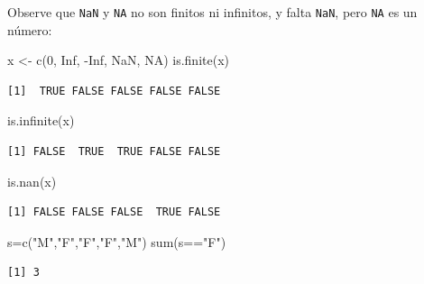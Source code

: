 \documentclass[
  ignorenonframetext,
  aspectratio=169,
  spanish,
]{beamer}
\newenvironment{Shaded}{\begin{snugshade}}{\end{snugshade}}
\newcommand{\ConstantTok}[1]{\textcolor[rgb]{0.56,0.35,0.01}{#1}}
\newcommand{\DecValTok}[1]{\textcolor[rgb]{0.68,0.00,0.00}{#1}}
\newcommand{\FunctionTok}[1]{\textcolor[rgb]{0.28,0.35,0.67}{#1}}
\newcommand{\NormalTok}[1]{\textcolor[rgb]{0.00,0.23,0.31}{#1}}
\newcommand{\OtherTok}[1]{\textcolor[rgb]{0.00,0.23,0.31}{#1}}
\newcommand{\SpecialCharTok}[1]{\textcolor[rgb]{0.37,0.37,0.37}{#1}}
\newcommand{\StringTok}[1]{\textcolor[rgb]{0.13,0.47,0.30}{#1}}
\begin{document}
\begin{frame}[fragile]{}
\label{section-7}
Observe que \texttt{NaN} y \texttt{NA} no son finitos ni infinitos, y
falta \texttt{NaN}, pero \texttt{NA} es un número:

\begin{Shaded}
\begin{Highlighting}[]
\NormalTok{x }\OtherTok{\textless{}{-}} \FunctionTok{c}\NormalTok{(}\DecValTok{0}\NormalTok{, }\ConstantTok{Inf}\NormalTok{, }\SpecialCharTok{{-}}\ConstantTok{Inf}\NormalTok{, }\ConstantTok{NaN}\NormalTok{, }\ConstantTok{NA}\NormalTok{) }
\FunctionTok{is.finite}\NormalTok{(x)}
\end{Highlighting}
\end{Shaded}

\begin{verbatim}
[1]  TRUE FALSE FALSE FALSE FALSE
\end{verbatim}
\end{frame}

\begin{frame}[fragile]{}
\label{section-8}
\begin{Shaded}
\begin{Highlighting}[]
\FunctionTok{is.infinite}\NormalTok{(x)}
\end{Highlighting}
\end{Shaded}

\begin{verbatim}
[1] FALSE  TRUE  TRUE FALSE FALSE
\end{verbatim}

\begin{Shaded}
\begin{Highlighting}[]
\FunctionTok{is.nan}\NormalTok{(x)}
\end{Highlighting}
\end{Shaded}

\begin{verbatim}
[1] FALSE FALSE FALSE  TRUE FALSE
\end{verbatim}

\begin{Shaded}
\begin{Highlighting}[]
\NormalTok{s}\OtherTok{=}\FunctionTok{c}\NormalTok{(}\StringTok{"M"}\NormalTok{,}\StringTok{"F"}\NormalTok{,}\StringTok{"F"}\NormalTok{,}\StringTok{"F"}\NormalTok{,}\StringTok{"M"}\NormalTok{) }
\FunctionTok{sum}\NormalTok{(s}\SpecialCharTok{==}\StringTok{"F"}\NormalTok{)  }
\end{Highlighting}
\end{Shaded}

\begin{verbatim}
[1] 3
\end{verbatim}
\end{frame}
\end{document}
